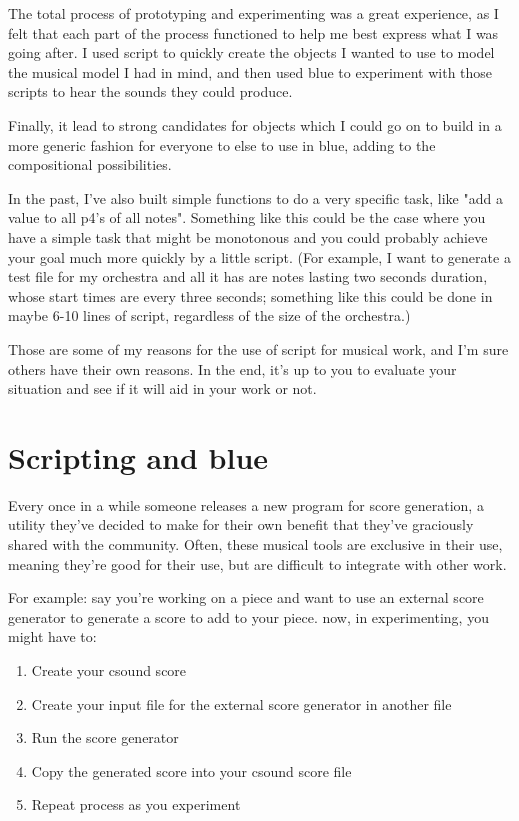 The total process of prototyping and experimenting was a great
experience, as I felt that each part of the process functioned to help
me best express what I was going after. I used script to quickly create
the objects I wanted to use to model the musical model I had in mind,
and then used blue to experiment with those scripts to hear the sounds
they could produce.

Finally, it lead to strong candidates for objects which I could go on to
build in a more generic fashion for everyone to else to use in blue,
adding to the compositional possibilities.

In the past, I've also built simple functions to do a very specific
task, like "add a value to all p4's of all notes". Something like this
could be the case where you have a simple task that might be monotonous
and you could probably achieve your goal much more quickly by a little
script. (For example, I want to generate a test file for my orchestra
and all it has are notes lasting two seconds duration, whose start times
are every three seconds; something like this could be done in maybe 6-10
lines of script, regardless of the size of the orchestra.)

Those are some of my reasons for the use of script for musical work, and
I'm sure others have their own reasons. In the end, it's up to you to
evaluate your situation and see if it will aid in your work or not.

\section{Scripting and blue}

Every once in a while someone releases a new program for score
generation, a utility they've decided to make for their own benefit that
they've graciously shared with the community. Often, these musical tools
are exclusive in their use, meaning they're good for their use, but are
difficult to integrate with other work.

For example: say you're working on a piece and want to use an external
score generator to generate a score to add to your piece. now, in
experimenting, you might have to:

\begin{enumerate}
\def\labelenumi{\arabic{enumi}.}
\item
  Create your csound score
\item
  Create your input file for the external score generator in another
  file
\item
  Run the score generator
\item
  Copy the generated score into your csound score file
\item
  Repeat process as you experiment
\end{enumerate}

